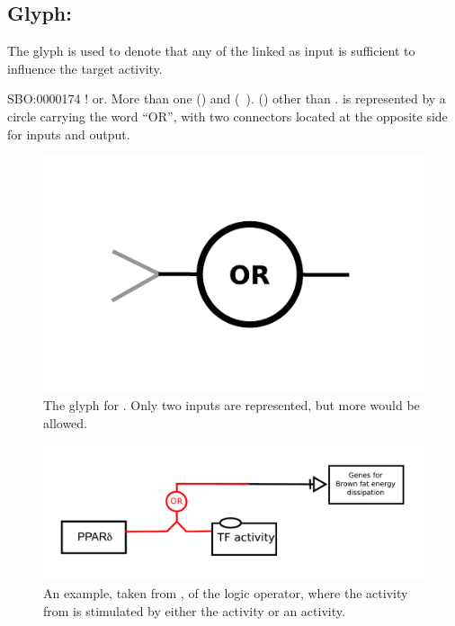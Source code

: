\subsection{Glyph: }
\label{sec:af:or}

The glyph  is used to denote that any of the  linked as input is sufficient to influence the target activity.

\begin{glyphDescription}
 \glyphSboTerm SBO:0000174 ! or.
 \glyphOrigin More than one  () and  (~).
 \glyphTarget  {} () other than .
 \glyphNode {} is represented by a circle carrying the word ``OR'', with two connectors located at the opposite side for inputs and output.
 \end{glyphDescription}

\begin{figure}[H]
  \centering
  \includegraphics[scale = 0.5]{images/or}
  \caption{The \AF glyph for . Only two inputs are represented, but more would be allowed.}
  \label{fig:af:or}
\end{figure}


\begin{figure}[H]
  \centering
  \includegraphics[scale = 0.5]{examples/ex-or}
  \caption{An example, taken from , of the  logic operator, where the activity from  is stimulated by either the  activity or an  activity.}
  \label{fig:af:ex-or}
\end{figure}
